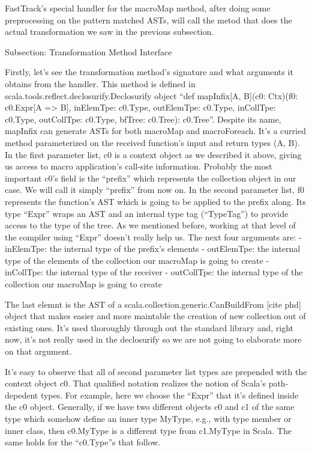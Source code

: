 FastTrack's special handler for the macroMap method, after
doing some preprocessing on the pattern matched ASTs, will call the metod
that does the actual transformation we saw in the previous subsection. 


Subsection: Transformation Method Interface

Firstly, let's see the transformation method's signature and what arguments it
obtains from the handler. This method is defined in
scala.tools.reflect.declosurify.Declosurify object ``def mapInfix[A, B](c0:
Ctx)(f0: c0.Expr[A => B], inElemTpe: c0.Type, outElemTpe: c0.Type, inCollTpe:
c0.Type, outCollTpe: c0.Type, bfTree: c0.Tree): c0.Tree''. Despite its name,
mapInfix can generate ASTs for both macroMap and macroForeach. It's a curried
method parameterized on the received function's input and return types (A, B).
In the first parameter list, c0 is a context object as we described it above,
giving us access to macro application's call-site information. Probably the most
important c0's field is the ``prefix'' which represents the collection object in
our case. We will call it simply ``prefix'' from now on. In the second parameter
list, f0 represents the function's AST which is going to be applied to the
prefix along. Its type ``Expr'' wraps an AST and an internal type tag
(``TypeTag'') to provide access to the type of the tree. As we mentioned before,
working at that level of the compiler using ``Expr'' doesn't really help us. The
next four arguments are:
 - inElemTpe: the internal type of the prefix's elements
 - outElemTpe: the internal type of the elements of the collection our macroMap
is going to create
- inCollTpe: the internal type of the receiver
- outCollTpe: the internal type of the collection our macroMap is going to
create

The last elemnt is the AST of a scala.collection.generic.CanBuildFrom [cite phd]
object that makes easier and more maintable the creation of new collection out
of existing ones. It's used thoroughly through out the standard library and,
right now, it's not really used in the declosurify so we are not going to
elaborate more on that argument.

It's easy to observe that all of second parameter list types are prepended
with the context object c0. That qualified notation realizes the notion of
Scala's path-depedent types. For example, here we choose the ``Expr'' that it's
defined inside the c0 object. Generally, if we have two different objects c0 and
c1 of the same type which somehow define an inner type MyType, e.g., with type
member or inner class,  then c0.MyType is a different type from c1.MyType in
Scala. The same holds for the ``c0.Type''s that follow.


